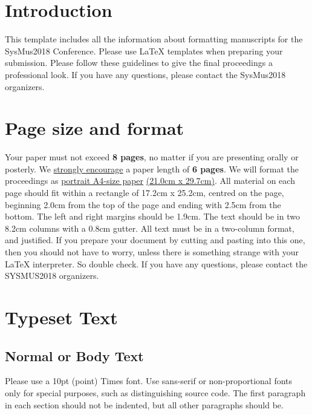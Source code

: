 \documentclass{article}
\title{\papertitle}
\begin{document}
%
\capstartfalse
\maketitle
\capstarttrue
%
\begin{abstract}
Place your abstract at the top left column on the first page.
Please write about 150--200 words that specifically highlight the purpose of your work,
its context, and provide a brief synopsis of your results.
Avoid equations in this part.
\end{abstract}
%

\section{Introduction}\label{sec:introduction}
This template includes all the information about formatting manuscripts for
the SysMus2018 Conference.
Please use \LaTeX{} templates when
preparing your submission.
Please follow these guidelines to give the final proceedings a professional look.
If you have any questions, please contact the SysMus2018 organizers.

\section{Page size and format}\label{sec:page_size}
Your paper must not exceed {\bf 8 pages},
no matter if you are presenting orally or posterly.
We \underline{strongly encourage}
a paper length of {\bf 6 pages}.
We will format the proceedings as
 \underline{portrait A4-size paper} \underline{(21.0cm x 29.7cm)}.
All material on each page should fit within a rectangle of 17.2cm x 25.2cm,
centred on the page, beginning 2.0cm from the top of the page and ending
with 2.5cm from the bottom.
The left and right margins should be 1.9cm.
The text should be in two 8.2cm columns with a 0.8cm gutter.
All text must be in a two-column format, and justified.
If you prepare your document by cutting and pasting into this one,
then you should not have to worry,
unless there is something strange with your \LaTeX{} interpreter.
So double check.
If you have any questions, please contact the SYSMUS2018 organizers.

\section{Typeset Text}\label{sec:typeset_text}

\subsection{Normal or Body Text}\label{subsec:body}
Please use a 10pt (point) Times font.
Use sans-serif or non-proportional fonts
only for special purposes,
such as distinguishing source code.
The first paragraph in each section should not be indented,
but all other paragraphs should be.
\end{document}
